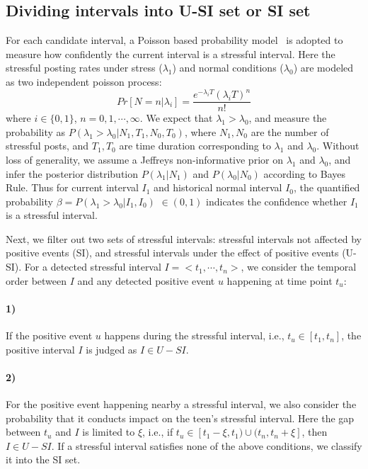 \subsection{Dividing intervals into U-SI set or SI set}
\label{alg:alg2}
For each candidate interval, 
a Poisson based probability model~\cite{Li2017Analyzing} is adopted to measure how confidently the current interval is a stressful interval.
Here the stressful posting rates under stress ($\lambda_1$) and normal conditions ($\lambda_0$) are modeled as two independent poisson process: 
\begin{equation}
Pr[N=n|\lambda_i]=\frac{e^{-\lambda_i T}{(\lambda_i T)}^n}{n!}
\end{equation}
where $i\in\{0,1\}$, $n=0,1,\cdots,\infty$.
We expect that $\lambda_1 > \lambda_0$, and measure the probability as $P(\lambda_1>\lambda_0|N_1, T_1, N_0, T_0)$,
where $N_1, N_0$ are the number of stressful posts, and $T_1, T_0$ are time duration corresponding to $\lambda_1$ and $\lambda_0$.
Without loss of generality, we assume a Jeffreys non-informative prior on $\lambda_1$ and $\lambda_0$,
and infer the posterior distribution $P(\lambda_1|N_1)$ and $P(\lambda_0|N_0)$ according to Bayes Rule.
Thus for current interval $I_1$ and historical normal interval $I_0$,
the quantified probability $\beta = P(\lambda_1>\lambda_0|I_1,I_0)$ $\in (0,1)$ indicates the confidence whether $I_1$ is a stressful interval.

Next, we filter out two sets of stressful intervals: stressful intervals not affected by positive events (SI),
and stressful intervals under the effect of positive events (U-SI).
For a detected stressful interval $I = <t_1,\cdots,t_n>$, we consider the temporal order between $I$ and any detected positive event $u$ happening at time point $t_u$:
\paragraph{1)} If the positive event $u$ happens during the stressful interval, i.e., $t_u \in [t_1,t_n]$, the positive interval $I$ is judged as $I \in U-SI$.
\paragraph{2)} For the positive event happening nearby a stressful interval,
we also consider the probability that it conducts impact on the teen's stressful interval.
Here the gap between $t_u$ and $I$ is limited to $\xi$, i.e.,
if $t_u \in [t_{1}-\xi, t_1)\cup(t_{n},t_{n}+\xi]$, then $I \in U-SI$. 
If a stressful interval satisfies none of the above conditions, we classify it into the SI set.

